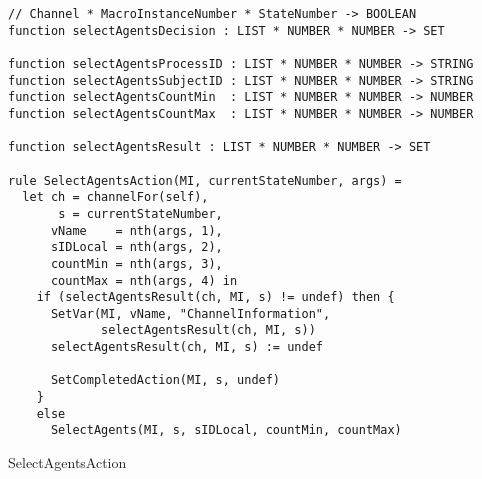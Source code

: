 \begin{listing}[H]
\begin{verbatim}
// Channel * MacroInstanceNumber * StateNumber -> BOOLEAN
function selectAgentsDecision : LIST * NUMBER * NUMBER -> SET

function selectAgentsProcessID : LIST * NUMBER * NUMBER -> STRING
function selectAgentsSubjectID : LIST * NUMBER * NUMBER -> STRING
function selectAgentsCountMin  : LIST * NUMBER * NUMBER -> NUMBER
function selectAgentsCountMax  : LIST * NUMBER * NUMBER -> NUMBER

function selectAgentsResult : LIST * NUMBER * NUMBER -> SET

rule SelectAgentsAction(MI, currentStateNumber, args) =
  let ch = channelFor(self),
       s = currentStateNumber,
      vName    = nth(args, 1),
      sIDLocal = nth(args, 2),
      countMin = nth(args, 3),
      countMax = nth(args, 4) in
    if (selectAgentsResult(ch, MI, s) != undef) then {
      SetVar(MI, vName, "ChannelInformation",
             selectAgentsResult(ch, MI, s))
      selectAgentsResult(ch, MI, s) := undef

      SetCompletedAction(MI, s, undef)
    }
    else
      SelectAgents(MI, s, sIDLocal, countMin, countMax)
\end{verbatim}
\caption{SelectAgentsAction}
\label{lst:asm:SelectAgentsAction}
\end{listing}




